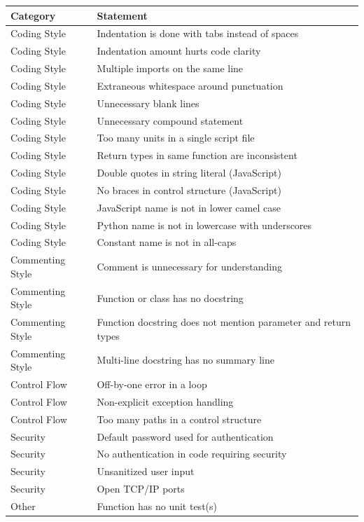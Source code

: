 \documentclass{article}
\begin{document}
\begin{center}
\begin{tabular}{|p{3cm}|p{8cm}|} 
\hline
\textbf{Category} & \textbf{Statement} \\
\hline
Coding Style & Indentation is done with tabs instead of spaces\\ 
\hline
Coding Style & Indentation amount hurts code clarity\\ 
\hline
Coding Style & Multiple imports on the same line\\ 
\hline
Coding Style & Extraneous whitespace around punctuation\\ 
\hline
Coding Style & Unnecessary blank lines\\ 
\hline
Coding Style & Unnecessary compound statement\\ 
\hline
Coding Style & Too many units in a single script file\\ 
\hline
Coding Style & Return types in same function are inconsistent\\ 
\hline
Coding Style & Double quotes in string literal (JavaScript)\\ 
\hline
Coding Style & No braces in control structure (JavaScript)\\ 
\hline
Coding Style & JavaScript name is not in lower camel case \\ 
\hline
Coding Style & Python name is not in lowercase with underscores\\ 
\hline
Coding Style & Constant name is not in all-caps\\ 
\hline
Commenting Style & Comment is unnecessary for understanding\\ 
\hline
Commenting Style & Function or class has no docstring\\ 
\hline
Commenting Style & Function docstring does not mention parameter and return types\\ 
\hline
Commenting Style & Multi-line docstring has no summary line\\ 
\hline
Control Flow & Off-by-one error in a loop\\ 
\hline
Control Flow & Non-explicit exception handling\\ 
\hline
Control Flow & Too many paths in a control structure\\ 
\hline
Security & Default password used for authentication\\ 
\hline
Security & No authentication in code requiring security\\ 
\hline
Security & Unsanitized user input\\ 
\hline
Security & Open TCP/IP ports\\ 
\hline
Other & Function has no unit test(s)\\ 
\hline
\end{tabular}
\end{center}
\end{document}
